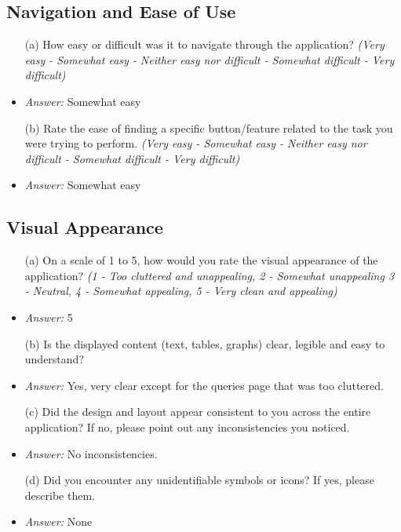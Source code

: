 \documentclass{article}
\begin{document}
\subsection*{\textbf{Navigation and Ease of Use}}
  \begin{itemize}
    \item[(a)] How easy or difficult was it to navigate through the
    application? \textit{(Very easy - Somewhat easy - Neither easy nor difficult
    - Somewhat difficult - Very difficult)}
    \item \emph{Answer:} Somewhat easy
    \item[(b)] Rate the ease of finding a specific button/feature related to the
    task you were trying to perform. \textit{(Very easy - Somewhat easy -
    Neither easy nor difficult - Somewhat difficult - Very difficult)}
    \item \emph{Answer:} Somewhat easy
  \end{itemize}

\subsection*{\textbf{Visual Appearance}}
  \begin{itemize}
    \item[(a)] On a scale of 1 to 5, how would you rate the visual appearance of
    the application? \textit{(1 - Too cluttered and unappealing, 2 - Somewhat
    unappealing 3 - Neutral, 4 - Somewhat appealing, 5 - Very clean and
    appealing)}
    \item \emph{Answer:} 5
    \item[(b)] Is the displayed content (text, tables, graphs) clear, legible
    and easy to understand?
    \item \emph{Answer:} Yes, very clear except for the queries page that was too cluttered.
    \item[(c)] Did the design and layout appear consistent to you across
    the entire application? If no, please point out any inconsistencies you noticed.
    \item \emph{Answer:} No inconsistencies.
    \item[(d)] Did you encounter any unidentifiable symbols or icons? If yes,
    please describe them.
    \item \emph{Answer:} None
  \end{itemize}
\end{document}
